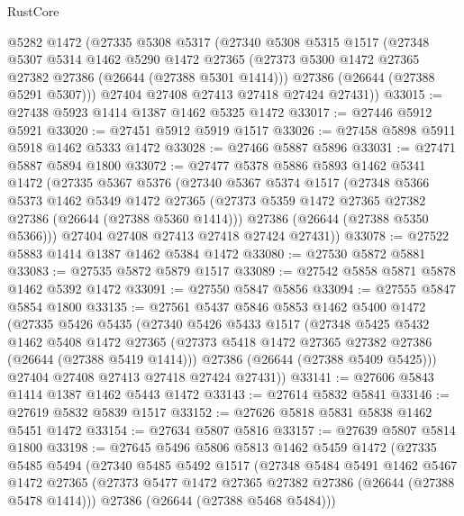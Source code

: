 \begin{lexlean}{RustCore}
\begin{coremodule}
    @5282
    @1472
    (@27335
      @5308
      @5317
      (@27340
        @5308
        @5315
        @1517
        (@27348
          @5307
          @5314
          @1462
          @5290
          @1472
          @27365
          (@27373 @5300 @1472 @27365 @27382 @27386 (@26644 (@27388 @5301 @1414)))
          @27386
          (@26644 (@27388 @5291 @5307)))
        @27404
        @27408
        @27413
        @27418
        @27424
        @27431))
@33015 := @27438 @5923 @1414 @1387 @1462 @5325 @1472
@33017 := @27446 @5912 @5921
@33020 := @27451 @5912 @5919 @1517
@33026 := @27458 @5898 @5911 @5918 @1462 @5333 @1472
@33028 := @27466 @5887 @5896
@33031 := @27471 @5887 @5894 @1800
@33072 := @27477
    @5378
    @5886
    @5893
    @1462
    @5341
    @1472
    (@27335
      @5367
      @5376
      (@27340
        @5367
        @5374
        @1517
        (@27348
          @5366
          @5373
          @1462
          @5349
          @1472
          @27365
          (@27373 @5359 @1472 @27365 @27382 @27386 (@26644 (@27388 @5360 @1414)))
          @27386
          (@26644 (@27388 @5350 @5366)))
        @27404
        @27408
        @27413
        @27418
        @27424
        @27431))
@33078 := @27522 @5883 @1414 @1387 @1462 @5384 @1472
@33080 := @27530 @5872 @5881
@33083 := @27535 @5872 @5879 @1517
@33089 := @27542 @5858 @5871 @5878 @1462 @5392 @1472
@33091 := @27550 @5847 @5856
@33094 := @27555 @5847 @5854 @1800
@33135 := @27561
    @5437
    @5846
    @5853
    @1462
    @5400
    @1472
    (@27335
      @5426
      @5435
      (@27340
        @5426
        @5433
        @1517
        (@27348
          @5425
          @5432
          @1462
          @5408
          @1472
          @27365
          (@27373 @5418 @1472 @27365 @27382 @27386 (@26644 (@27388 @5419 @1414)))
          @27386
          (@26644 (@27388 @5409 @5425)))
        @27404
        @27408
        @27413
        @27418
        @27424
        @27431))
@33141 := @27606 @5843 @1414 @1387 @1462 @5443 @1472
@33143 := @27614 @5832 @5841
@33146 := @27619 @5832 @5839 @1517
@33152 := @27626 @5818 @5831 @5838 @1462 @5451 @1472
@33154 := @27634 @5807 @5816
@33157 := @27639 @5807 @5814 @1800
@33198 := @27645
    @5496
    @5806
    @5813
    @1462
    @5459
    @1472
    (@27335
      @5485
      @5494
      (@27340
        @5485
        @5492
        @1517
        (@27348
          @5484
          @5491
          @1462
          @5467
          @1472
          @27365
          (@27373 @5477 @1472 @27365 @27382 @27386 (@26644 (@27388 @5478 @1414)))
          @27386
          (@26644 (@27388 @5468 @5484)))

\end{coremodule}
\end{lexlean}
